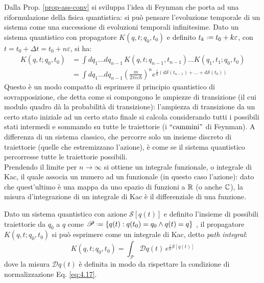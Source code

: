 Dalla Prop. \ref{prop-ass-conv} si sviluppa l'idea di Feynman che porta ad una riformulazione della fisica quantistica: si può pensare l'evoluzione temporale di un sistema come una successione di evoluzioni temporali infinitesime. Dato un sistema quantistico con propagatore $ K(q,t ; q_0,t_0) $ e definito $ t_k \defeq t_0 + k \varepsilon $, con $ t = t_0 + \Delta t = t_0 + n \varepsilon $, si ha:
\begin{equation*}
	\begin{split}
		K(q,t ; q_0,t_0)
		&= \int dq_1 \dots dq_{n-1}\, K(q,t ; q_{n-1},t_{n-1}) \dots K(q_1,t_1 ; q_0,t_0) \\
		&= \int dq_1 \dots dq_{n-1} \left( \frac{m}{2\pi i \varepsilon \hbar} \right)^n e^{\frac{i}{\hbar} ( d\mathcal{S}(t_{n-1}) + \dots + d\mathcal{S}(t_0) )}
	\end{split}
\end{equation*}
Questo è un modo compatto di esprimere il principio quantistico di sovrapposizione, che detta come si compongono le ampiezze di transizione (il cui modulo quadro dà la probabilità di transizione): l'ampiezza di transizione da un certo stato iniziale ad un certo stato finale si calcola considerando tutti i possibili stati intermedi e sommando su tutte le traiettorie (i $ ``\text{cammini}" $ di Feynman). A differenza di un sistema classico, che percorre solo un insieme discreto di traiettorie (quelle che estremizzano l'azione), è come se il sistema quantistico percorresse tutte le traiettorie possibili.\\
Prendendo il limite per $ n \rightarrow \infty $ si ottiene un integrale funzionale, o integrale di Kac, il quale associa un numero ad un funzionale (in questo caso l'azione): dato che quest'ultimo è una mappa da uno spazio di funzioni a $ \mathbb{R} $ (o anche $ \mathbb{C} $), la misura d'integrazione di un integrale di Kac è il differenziale di una funzione.

\begin{proposition}
	Dato un sistema quantistico con azione $ \mathcal{S}[q(t)] $ e definito l'insieme di possibili traiettorie da $ q_0 $ a $ q $ come $ \mathscr{P} \defeq \{q(t) : q(t_0) = q_0 \land q(t) = q\} $ , il propagatore $ K(q,t ; q_0,t_0) $ si può esprimere come un integrale di Kac, detto \textit{path integral}:
	\begin{equation}
		K(q,t ; q_0,t_0) = \int_{\mathscr{P}} \mathcal{D}q(t)\, e^{\frac{i}{\hbar} \mathcal{S}[q(t)]}
		\label{eq:4.18}
	\end{equation}
	dove la misura $ \mathcal{D}q(t) $ è definita in modo da rispettare la condizione di normalizzazione Eq. \ref{eq:4.17}.
\end{proposition}

